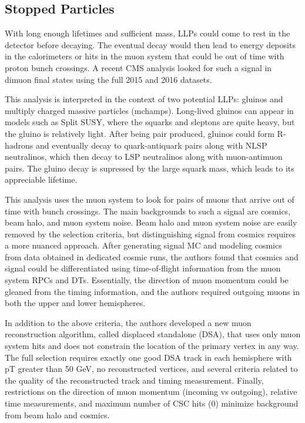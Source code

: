 \documentclass[12pt]{article}
\begin{document}
\subsection{Stopped Particles}
    With long enough lifetimes and sufficient mass, LLPs could come to rest in the detector before decaying. The eventual decay would then lead to energy deposits in the calorimeters or hits in the muon system that could be out of time with proton bunch crossings. A recent CMS analysis looked for such a signal in dimuon final states using the full 2015 and 2016 datasets. 

    This analysis is interpreted in the context of two potential LLPs: gluinos and multiply charged massive particles (mchamps). Long-lived gluinos can appear in models such as Split SUSY, where the squarks and sleptons are quite heavy, but the gluino is relatively light. After being pair produced, gluinos could form R-hadrons and eventually decay to quark-antiquark pairs along with NLSP neutralinos, which then decay to LSP neutralinos along with muon-antimuon pairs. The gluino decay is supressed by the large squark mass, which leads to its appreciable lifetime.

    This analysis uses the muon system to look for pairs of muons that arrive out of time with bunch crossings. The main backgrounds to such a signal are cosmics, beam halo, and muon system noise. Beam halo and muon system noise are easily removed by the selection criteria, but distinguishing signal from cosmics requires a more nuanced approach. After generating signal MC and modeling cosmics from data obtained in dedicated cosmic runs, the authors found that cosmics and signal could be differentiated using time-of-flight information from the muon system RPCs and DTs. Essentially, the direction of muon momentum could be gleaned from the timing information, and the authors required outgoing muons in both the upper and lower hemispheres.
    
    In addition to the above criteria, the authors developed a new muon reconstruction algorithm, called displaced standalone (DSA), that uses only muon system hits and does not constrain the location of the primary vertex in any way. The full selection requires exactly one good DSA track in each hemisphere with pT greater than 50 GeV, no reconstructed vertices, and several criteria related to the quality of the reconstructed track and timing measurement. Finally, restrictions on the direction of muon momentum (incoming vs outgoing), relative time measurements, and maximum number of CSC hits (0) minimize background from beam halo and cosmics.
\end{document}
